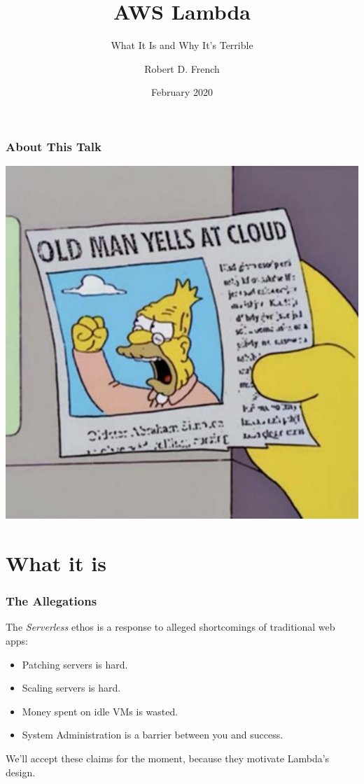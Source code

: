 \documentclass{beamer}
\title{AWS Lambda}
\subtitle{What It Is and Why It's Terrible}
\author{Robert D. French}
\date{February 2020}
\begin{document}
\frame{\titlepage}

\begin{frame}
	\frametitle{About This Talk}
	\centering
	\includegraphics[scale=0.35]{cloud.jpg}
\end{frame}

\section{What it is}
\frame{\sectionpage}

\begin{frame}
	\frametitle{The Allegations}
	The \emph{Serverless} ethos is a response to alleged shortcomings of traditional
	web apps:
	\begin{itemize}
		\pause \item Patching servers is hard.
		\pause \item Scaling servers is hard.
		\pause \item Money spent on idle VMs is wasted.
		\pause \item System Administration is a barrier between you and success.
	\end{itemize}
	\pause
	We'll accept these claims for the moment, because they motivate Lambda's design.
\end{frame}
\end{document}
